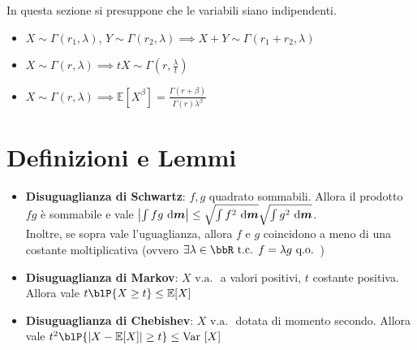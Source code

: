 \documentclass[a4paper, NoNotes, GeneralMath]{stdmdoc}
\newcommand{\E}[1]{\mathbb{E}[{#1}]}
\newcommand{\Var}[1]{\mbox{Var }[{#1}]}
\newcommand{\va}{\mbox{ v.a. }}
\newcommand{\qo}{\mbox{ q.o. }}
\begin{document}
	In questa sezione si presuppone che le variabili siano indipendenti.
	\begin{itemize}
		\item $X \sim \Gamma(r_1, \lambda)$, $Y \sim \Gamma(r_2, \lambda) \implies X+Y \sim \Gamma(r_1 + r_2, \lambda)$
		\item $X \sim \Gamma(r, \lambda) \implies tX \sim \Gamma(r, \frac{\lambda}{t})$
		\item $X \sim \Gamma(r, \lambda) \implies \E{X^\beta} = \frac{\Gamma(r+\beta)}{\Gamma(r)\lambda^\beta}$
	\end{itemize}

	\section*{Definizioni e Lemmi}
	\begin{itemize}
		\item {\bf Disuguaglianza di Schwartz}: $f,g$ quadrato sommabili. Allora il prodotto $fg$ è sommabile e vale $\left| \int fg \de{\bm{m}} \right| \le \sqrt{\int f^2 \de{\bm{m}}} \sqrt{\int g^2 \de{\bm{m}}}$. \\ Inoltre, se sopra vale l'uguaglianza, allora $f$ e $g$ coincidono a meno di una costante moltiplicativa (ovvero $\exists \lambda \in \bbR \tc f = \lambda g \qo$)
		\item {\bf Disuguaglianza di Markov}: $X \va$ a valori positivi, $t$ costante positiva. Allora vale $t \blP\{X \ge t\} \le \E{X}$
		\item {\bf Disuguaglianza di Chebishev}: $X \va$ dotata di momento secondo. Allora vale $t^2 \blP\{\left| X - \E{X} \right| \ge t \} \le \Var{X}$
		
	\end{itemize}
\end{document}

